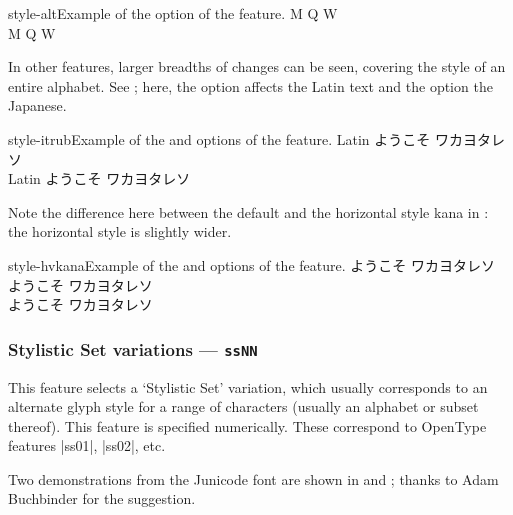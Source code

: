 \documentclass[a4paper]{l3doc}
\begin{document}
 \begin{Xexample}[firstline=2]{style-alt}{Example of the  option of the  feature.}
  \Large
   M Q W                      \\
   M Q W
\end{Xexample}

In other features, larger breadths of changes can be seen, covering
the style of an entire alphabet.
See ; here, the  option affects the Latin text
and the  option the Japanese.

\begin{Xexample}[firstline=2]{style-itrub}{Example of the  and  options of the  feature.}
  \Large \def\kana{ようこそ ワカヨタレソ}
   Latin \kana        \\
   Latin \kana
\end{Xexample}

Note the difference here between the default and the horizontal style kana
in : the horizontal style is slightly wider.

\begin{Xexample}[firstline=2]{style-hvkana}{Example of the  and  options of the  feature.}
  \Large \def\kana{ようこそ ワカヨタレソ}
    \kana   \\
  {
    \kana } \\
  {
    \kana }
\end{Xexample}


\subsubsection{Stylistic Set variations --- \texttt{ssNN}}
\label{sec:ot-ss}

This feature selects a `Stylistic Set' variation,
which usually corresponds to an alternate glyph style for a range of
characters (usually an alphabet or subset thereof).
This feature is specified numerically. These correspond to OpenType
features |ss01|, |ss02|, etc.

Two demonstrations from the Junicode
font
are shown in  and ; thanks to Adam
Buchbinder for the suggestion.
\end{document}
